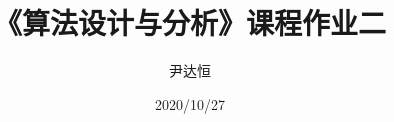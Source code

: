 \documentclass[a4paper]{ctexart}
\title{《算法设计与分析》课程作业二}
\author{尹达恒}
\date{2020/10/27}
\begin{document}
\begin{titlepage}
\maketitle
\end{titlepage}










\end{document}
